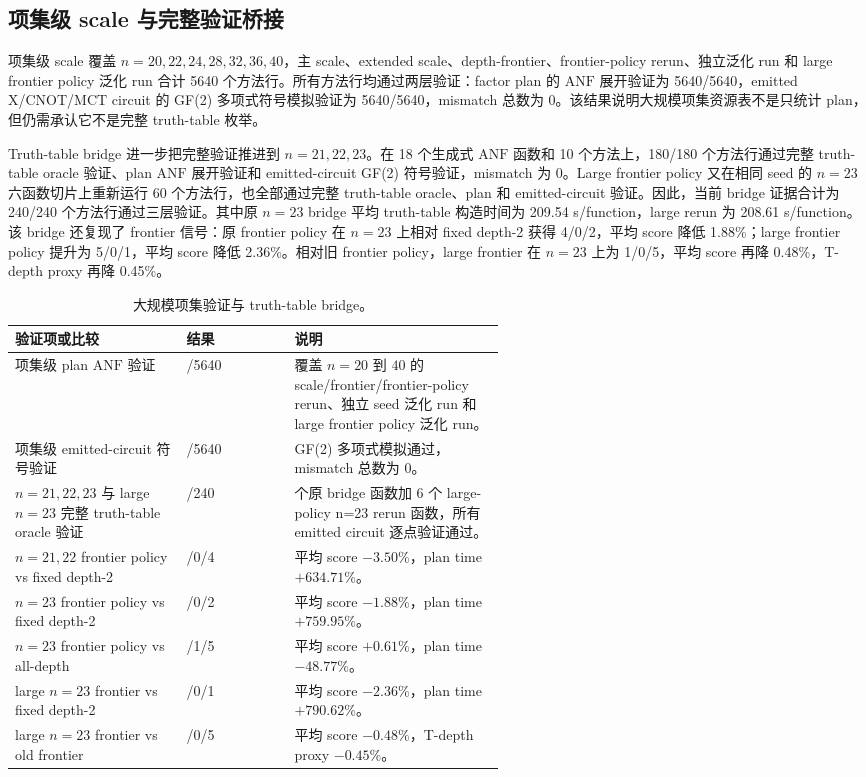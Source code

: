 \documentclass[UTF8,fontset=macnew,11pt]{ctexart}
\newcommand{\anf}{\ensuremath{\mathrm{ANF}}}
\newcommand{\ttable}{truth-table}
\newcommand{\mct}{\ensuremath{\mathrm{MCT}}}
\begin{document}
\subsection{项集级 scale 与完整验证桥接}

项集级 scale 覆盖 $n=20,22,24,28,32,36,40$，主 scale、extended scale、depth-frontier、frontier-policy rerun、独立泛化 run 和 large frontier policy 泛化 run 合计 5640 个方法行。所有方法行均通过两层验证：factor plan 的 \anf{} 展开验证为 5640/5640，emitted X/CNOT/\mct{} circuit 的 GF(2) 多项式符号模拟验证为 5640/5640，mismatch 总数为 0。该结果说明大规模项集资源表不是只统计 plan，但仍需承认它不是完整 \ttable{} 枚举。

Truth-table bridge 进一步把完整验证推进到 $n=21,22,23$。在 18 个生成式 \anf{} 函数和 10 个方法上，180/180 个方法行通过完整 \ttable{} oracle 验证、plan \anf{} 展开验证和 emitted-circuit GF(2) 符号验证，mismatch 为 0。Large frontier policy 又在相同 seed 的 $n=23$ 六函数切片上重新运行 60 个方法行，也全部通过完整 \ttable{} oracle、plan 和 emitted-circuit 验证。因此，当前 bridge 证据合计为 240/240 个方法行通过三层验证。其中原 $n=23$ bridge 平均 truth-table 构造时间为 209.54 s/function，large rerun 为 208.61 s/function。该 bridge 还复现了 frontier 信号：原 frontier policy 在 $n=23$ 上相对 fixed depth-2 获得 4/0/2，平均 score 降低 1.88\%；large frontier policy 提升为 5/0/1，平均 score 降低 2.36\%。相对旧 frontier policy，large frontier 在 $n=23$ 上为 1/0/5，平均 score 再降 0.48\%，T-depth proxy 再降 0.45\%。

\begin{table}[H]
\centering
\scriptsize
\caption{大规模项集验证与 truth-table bridge。}
\label{tab:verification}
\begin{tabularx}{\linewidth}{>{\raggedright\arraybackslash}p{0.35\linewidth}>{\raggedright\arraybackslash}p{0.22\linewidth}>{\raggedright\arraybackslash}X}
\toprule
验证项或比较 & 结果 & 说明 \\
\midrule
项集级 plan \anf{} 验证 & 5640/5640 & 覆盖 $n=20$ 到 $40$ 的 scale/frontier/frontier-policy rerun、独立 seed 泛化 run 和 large frontier policy 泛化 run。 \\
项集级 emitted-circuit 符号验证 & 5640/5640 & GF(2) 多项式模拟通过，mismatch 总数为 0。 \\
$n=21,22,23$ 与 large $n=23$ 完整 \ttable{} oracle 验证 & 240/240 & 18 个原 bridge 函数加 6 个 large-policy n=23 rerun 函数，所有 emitted circuit 逐点验证通过。 \\
$n=21,22$ frontier policy vs fixed depth-2 & 8/0/4 & 平均 score $-3.50\%$，plan time $+634.71\%$。 \\
$n=23$ frontier policy vs fixed depth-2 & 4/0/2 & 平均 score $-1.88\%$，plan time $+759.95\%$。 \\
$n=23$ frontier policy vs all-depth & 0/1/5 & 平均 score $+0.61\%$，plan time $-48.77\%$。 \\
large $n=23$ frontier vs fixed depth-2 & 5/0/1 & 平均 score $-2.36\%$，plan time $+790.62\%$。 \\
large $n=23$ frontier vs old frontier & 1/0/5 & 平均 score $-0.48\%$，T-depth proxy $-0.45\%$。 \\
\bottomrule
\end{tabularx}
\end{table}
\end{document}
